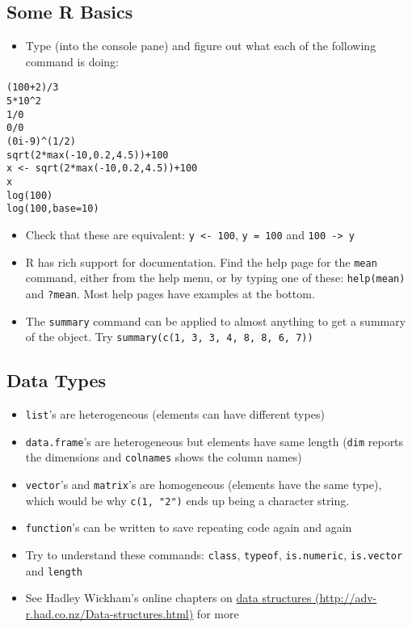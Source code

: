 \documentclass[]{article}
\providecommand{\tightlist}{%
  \setlength{\itemsep}{0pt}\setlength{\parskip}{0pt}}
\begin{document}
\hypertarget{some-r-basics}{%
\subsection{Some R Basics}\label{some-r-basics}}

\begin{itemize}
\tightlist
\item
  Type (into the console pane) and figure out what each of the following
  command is doing:
\end{itemize}

\begin{verbatim}
(100+2)/3
5*10^2
1/0
0/0
(0i-9)^(1/2)
sqrt(2*max(-10,0.2,4.5))+100
x <- sqrt(2*max(-10,0.2,4.5))+100
x
log(100)
log(100,base=10)
\end{verbatim}

\begin{itemize}
\tightlist
\item
  Check that these are equivalent: \texttt{y\ \textless{}-\ 100},
  \texttt{y\ =\ 100} and \texttt{100\ -\textgreater{}\ y}
\item
  R has rich support for documentation. Find the help page for the
  \texttt{mean} command, either from the help menu, or by typing one of
  these: \texttt{help(mean)} and \texttt{?mean}. Most help pages have
  examples at the bottom.
\item
  The \texttt{summary} command can be applied to almost anything to get
  a summary of the object. Try
  \texttt{summary(c(1,\ 3,\ 3,\ 4,\ 8,\ 8,\ 6,\ 7))}
\end{itemize}

\hypertarget{data-types}{%
\subsection{Data Types}\label{data-types}}

\begin{itemize}
\item
  \texttt{list}'s are heterogeneous (elements can have different types)
\item
  \texttt{data.frame}'s are heterogeneous but elements have same length
  (\texttt{dim} reports the dimensions and \texttt{colnames} shows the
  column names)
\item
  \texttt{vector}'s and \texttt{matrix}'s are homogeneous (elements have
  the same type), which would be why \texttt{c(1,\ "2")} ends up being a
  character string.
\item
  \texttt{function}'s can be written to save repeating code again and
  again
\item
  Try to understand these commands: \texttt{class}, \texttt{typeof},
  \texttt{is.numeric}, \texttt{is.vector} and \texttt{length}
\item
  See Hadley Wickham's online chapters on
  \href{http://adv-r.had.co.nz/Data-structures.html}{data structures
  (http://adv-r.had.co.nz/Data-structures.html)} for more
\end{itemize}
\end{document}
